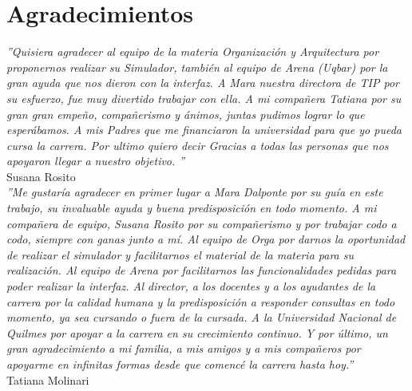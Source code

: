 \section*{Agradecimientos}


\textit{''Quisiera agradecer al equipo de la materia Organización y Arquitectura por proponernos realizar su Simulador, también al equipo de Arena (Uqbar) por la gran ayuda que nos dieron con la interfaz. A Mara nuestra directora de TIP por su esfuerzo, fue muy divertido trabajar con ella. A mi compañera Tatiana por su gran gran empeño, compañerismo y ánimos, juntas pudimos lograr lo que esperábamos. A mis Padres que me financiaron la universidad para que yo pueda cursa la carrera. Por ultimo quiero decir Gracias a todas las personas que nos apoyaron llegar a nuestro objetivo. ''}\\

Susana Rosito\\

\textit{''Me gustaría agradecer en primer lugar a Mara Dalponte por su guía en este trabajo, su invaluable ayuda y buena predisposición en todo momento.
A mi compañera de equipo, Susana Rosito por su compañerismo y por trabajar codo a codo, siempre con ganas junto a mí.
Al equipo de Orga por darnos la oportunidad de realizar el simulador y facilitarnos el material de la materia para su realización.
Al equipo de Arena por facilitarnos las funcionalidades pedidas para poder realizar la interfaz.
Al director, a los docentes y a los ayudantes de la carrera por la calidad humana y la predisposición a responder consultas en todo momento, ya sea cursando o fuera de la cursada.
A la Universidad Nacional de Quilmes por apoyar a la carrera en su crecimiento continuo.
Y por último, un gran agradecimiento a mi familia, a mis amigos y a mis compañeros por apoyarme en infinitas formas desde que comencé la carrera hasta hoy.''}\\

Tatiana Molinari